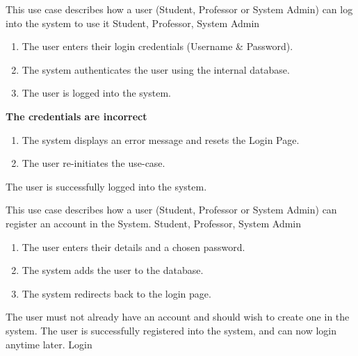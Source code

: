 \documentclass[12pt, a4]{report}
\begin{document}
{ %
This use case describes how a user (Student, Professor or System Admin) can log into the system to use it
}
{ %
Student, Professor, System Admin
}
{ %
\begin{enumerate}
    \item The user enters their login credentials (Username \& Password).
    \item The system authenticates the user using the internal database.
    \item The user is logged into the system.
\end{enumerate}
}
{ %
\textbf{The credentials are incorrect}
\begin{enumerate}
    \item The system displays an error message and resets the Login Page.
    \item The user re-initiates the use-case.
\end{enumerate}
}
{ %
}
{ %
The user is successfully logged into the system.
}
{ %
}
{ %
}


\newpage
{}
{ %
This use case describes how a user (Student, Professor or System Admin) can register an account in the System.
}
{ %
Student, Professor, System Admin
}
{ %
\begin{enumerate}
    \item The user enters their details and a chosen password.
    \item The system adds the user to the database.
    \item The system redirects back to the login page.
\end{enumerate}
}
{ %
}
{ %
The user must not already have an account and should wish to create one in the system.
}
{ %
The user is successfully registered into the system, and can now login anytime later.
}
{ %
}
{ %
Login
}

\end{document}
